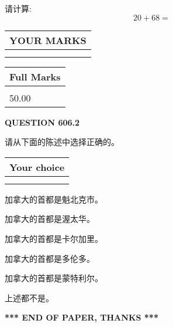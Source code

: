 \documentclass{ctexart}
\begin{document}
  
 
请计算:
\begin{equation}
20 +  %
68 = \nonumber
\end{equation}
 

 

 
  
\vspace{0.2in}
  
\noindent\begin{tabular}{|l|}
\hline
 YOUR MARKS  \\
\hline
 \\ 
 \\ 
\hline
\end{tabular}
\hspace{0.05in} \begin{tabular}{|l|}
\hline
 Full Marks  \\
\hline
 \\ 
50.00 \\
\hline
\end{tabular}
{\textbf{\Large{QUESTION
606.2 
}}}
  
  
请从下面的陈述中选择正确的。
  
  
\noindent\hspace{3.0in} \begin{tabular}{|l|}
\hline
Your choice \\
\hline
 \\ 
 \\ 
\hline
\end{tabular}
  
  
 
 
加拿大的首都是魁北克市。
 
 
加拿大的首都是渥太华。
 
 
加拿大的首都是卡尔加里。
 
 
加拿大的首都是多伦多。
 
 
加拿大的首都是蒙特利尔。
 
 
 上述都不是。
 
 
   
   
 \vspace{0.2in}
 
   
   
   
   
\vspace{1.0in} 
{\textbf{\large{ *** END OF PAPER, THANKS *** }}} 
   
\end{document}

